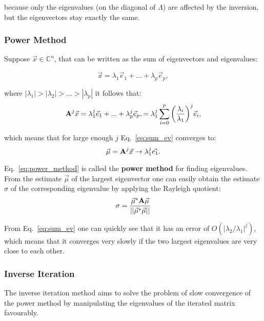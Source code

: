 because only the eigenvalues (on the diagonal of $\Lambda$) are affected by
the inversion, but the eigenvectors stay exactly the same.


\subsubsection{Power Method}
\label{ssub:power_method}
Suppose $\vec{x} \in \mathbb{C} ^n$, that can be written as the sum of eigenvectors
and eigenvalues:

\begin{equation}
  \vec{x} = \lambda_1\vec{e}_1 + ... + \lambda_p\vec{e}_p,
\end{equation}

where $|\lambda_1| > |\lambda_2| > ... > |\lambda_p|$ it follows that:
\begin{equation}
  \label{eq:sum_ev}
  \boldsymbol{\textbf{A}}^j \vec{x} = \lambda_1^j\vec{e}_1 + ... + \lambda_p^j\vec{e}_p,
  =  \lambda_1^j \sum_{i=0}^{p} \bigg(\frac{\lambda_i}{\lambda_1}\bigg)^j \vec{e}_i,
\end{equation}

which means that for large enough $j$ Eq.~\ref{eq:sum_ev} converges to:
\begin{equation}
  \label{eq:power_method}
  \vec{\mu} = \boldsymbol{\textbf{A}}^j \vec{x} \rightarrow \lambda_1^j \vec{e_1}.
\end{equation}

Eq.~\ref{eq:power_method} is called the \textbf{power method} for finding eigenvalues.
From the estimate $\vec{\mu}$ of the largest eigenvector one can easily obtain the estimate
$\sigma$ of the corresponding eigenvalue by applying the Rayleigh quotient:
\begin{equation}
  \label{eq:rayleigh_quotient}
  \sigma = \frac{\vec{\mu}^* \boldsymbol{\textbf{A}} \vec{\mu}}{||\vec{\mu}^* \vec{\mu}||}
\end{equation}

From Eq.~\ref{eq:sum_ev} one can quickly see that it has an error of $O(|\lambda_2/\lambda_1|^j)$,
which means that it converges very slowly if the two largest eigenvalues are very
close to each other.


\subsubsection{Inverse Iteration}
\label{ssub:inverse_iteration}
The inverse iteration method aims to solve the problem of slow convergence of the
power method by manipulating the eigenvalues of the iterated matrix favourably.

